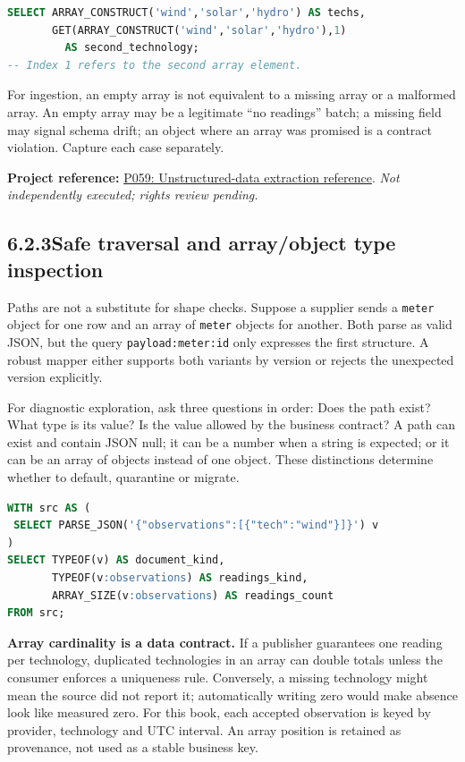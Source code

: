 \documentclass[11pt,twoside]{article}
\newcommand{\topic}[2]{\subsection*{#1\quad #2}}
\newcommand{\repo}[2]{\par\begingroup\fontsize{8.0}{9.6}\selectfont\sffamily\color{inkgray}\textbf{Project reference:} \href{#2}{#1}. \textit{Not independently executed; rights review pending.}\par\endgroup}
\begin{document}
\begin{lstlisting}[language=SQL,caption={Object versus array: names compared with positions.}]
SELECT ARRAY_CONSTRUCT('wind','solar','hydro') AS techs,
       GET(ARRAY_CONSTRUCT('wind','solar','hydro'),1)
         AS second_technology;
-- Index 1 refers to the second array element.
\end{lstlisting}
For ingestion, an empty array is not equivalent to a missing array or a malformed array. An empty array may be a legitimate ``no readings'' batch; a missing field may signal schema drift; an object where an array was promised is a contract violation. Capture each case separately.
\repo{P059: Unstructured-data extraction reference}{https://github.com/Snowflake-Labs/sfguide-gaining-insights-from-unstructured-data-with-cortex-ai}
\newpage
\topic{6.2.3}{Safe traversal and array/object type inspection}
Paths are not a substitute for shape checks. Suppose a supplier sends a \texttt{meter} object for one row and an array of \texttt{meter} objects for another. Both parse as valid JSON, but the query \texttt{payload:meter:id} only expresses the first structure. A robust mapper either supports both variants by version or rejects the unexpected version explicitly.

For diagnostic exploration, ask three questions in order: Does the path exist? What type is its value? Is the value allowed by the business contract? A path can exist and contain JSON null; it can be a number when a string is expected; or it can be an array of objects instead of one object. These distinctions determine whether to default, quarantine or migrate.

\begin{lstlisting}[language=SQL,caption={Non-destructive shape inspection of an array field.}]
WITH src AS (
 SELECT PARSE_JSON('{"observations":[{"tech":"wind"}]}') v
)
SELECT TYPEOF(v) AS document_kind,
       TYPEOF(v:observations) AS readings_kind,
       ARRAY_SIZE(v:observations) AS readings_count
FROM src;
\end{lstlisting}
\textbf{Array cardinality is a data contract.} If a publisher guarantees one reading per technology, duplicated technologies in an array can double totals unless the consumer enforces a uniqueness rule. Conversely, a missing technology might mean the source did not report it; automatically writing zero would make absence look like measured zero. For this book, each accepted observation is keyed by provider, technology and UTC interval. An array position is retained as provenance, not used as a stable business key.
\end{document}
